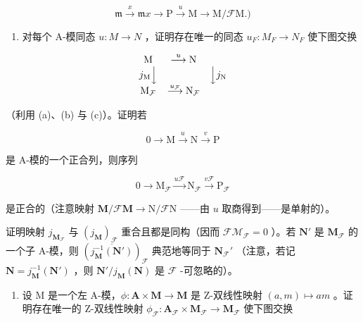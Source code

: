 \[
\mathfrak {m} \xrightarrow {x} \mathfrak {m} x \to \mathrm{P} \xrightarrow {u} \mathrm{M} \to \mathrm{M} / \mathcal {F} \mathrm{M.})
\]

\begin{enumerate}
\def\labelenumi{(\alph{enumi})}
\setcounter{enumi}{3}
\tightlist
\item
  对每个 A-模同态 \(u: M \rightarrow N\) ，证明存在唯一的同态 \(u_{F}: M_{F} \rightarrow N_{F}\) 使下图交换
\end{enumerate}

\[
\begin{array}{c c c} \mathrm{M} & \stackrel {{u}} {{\longrightarrow}} \mathrm{N} \\ j _ {\mathrm{M}} \Big \downarrow & & \Big \downarrow j _ {\mathrm{N}} \\ \mathrm{M} _ {\mathcal {F}} & \stackrel {{u _ {\mathcal {F}}}} {{\longrightarrow}} \mathrm{N} _ {\mathcal {F}} \end{array}
\]

（利用 (a)、(b) 与 (c)）。证明若

\[
0 \longrightarrow \mathrm{M} \stackrel {u} {\longrightarrow} \mathrm{N} \stackrel {v} {\longrightarrow} \mathrm{P}
\]

是 A-模的一个正合列，则序列

\[
0 \longrightarrow \mathrm{M} _ {\mathcal {F}} \stackrel {u \mathcal {F}} {\longrightarrow} \mathrm{N} _ {\mathcal {F}} \stackrel {v \mathcal {F}} {\longrightarrow} \mathrm{P} _ {\mathcal {F}}
\]

是正合的（注意映射 \(\mathbf{M} / \mathcal{F}\mathbf{M}\to \mathrm{N} / \mathcal{F}\mathrm{N}\) ——由 \(u\) 取商得到——是单射的）。

证明映射 \(j_{\mathbf{M}_{\mathcal{F}}}\) 与 \((j_{\mathbf{M}})_{\mathcal{F}}\) 重合且都是同构（因而 \(\mathcal{FM}_{\mathcal{F}} = 0\) ）。若 \(\mathbf{N}'\) 是 \(\mathbf{M}_{\mathcal{F}}\) 的一个子 A-模，则 \((\overline{j_{\mathbf{M}}^{-1}(\mathbf{N}')})_{\mathcal{F}}\) 典范地等同于 \(\mathbf{N}_{\mathcal{F}}'\) （注意，若记 \(\mathbf{N} = j_{\mathbf{M}}^{-1}(\mathbf{N}')\) ，则 \(\mathbf{N}' / j_{\mathbf{M}}(\mathbf{N})\) 是 \(\mathcal{F}\) -可忽略的）。

\begin{enumerate}
\def\labelenumi{(\alph{enumi})}
\setcounter{enumi}{4}
\tightlist
\item
  设 M 是一个左 A-模，\(\phi: \mathbf{A} \times \mathbf{M} \to \mathbf{M}\) 是 Z-双线性映射 \((a, m) \mapsto am\) 。证明存在唯一的 Z-双线性映射 \(\phi_{\mathcal{F}}: \mathbf{A}_{\mathcal{F}} \times \mathbf{M}_{\mathcal{F}} \to \mathbf{M}_{\mathcal{F}}\) 使下图交换
\end{enumerate}


